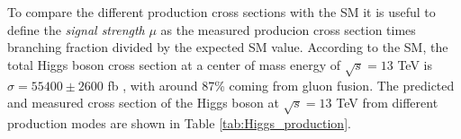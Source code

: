 
To compare the different production cross sections with the SM it is useful to define the \textit{signal strength} $\mu$ as the measured producion cross section times branching fraction divided by the expected SM value. According to the SM, the total Higgs boson cross section at a center of mass energy of $\sqrt{s} = 13$ TeV is $\sigma = 55400 \pm 2600$ fb \cite{LHCHiggsCrossSectionWorkingGroup:2016ypw}, with around 87\% coming from gluon fusion. The predicted and measured cross section of the Higgs boson at $\sqrt{s} = 13$ TeV from different production modes are shown in Table \ref{tab:Higgs_production}.


